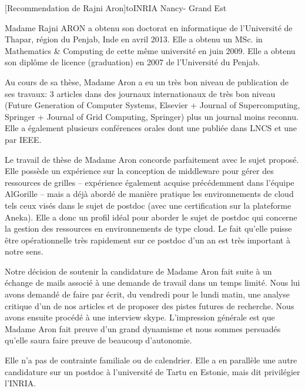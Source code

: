 \documentclass[a4paper,10pt]{article}
\begin{document}

\begin{letter}[Recommendation de Rajni Aron]{to}{INRIA Nancy- Grand Est}


Madame  Rajni ARON  a obtenu  son doctorat  en informatique  de l'Université  de
Thapar,  région  du Penjab,  Inde  en  avril 2013.  Elle  a  obtenu un  MSc.  in
Mathematics \&  Computing de cette même  université en juin 2009.  Elle a obtenu
son diplôme de licence (graduation) en 2007 de l'Université du Penjab.

Au cours de sa thèse, Madame Aron a  eu un très bon niveau de publication de ses
travaux: 3 articles dans des journaux  internationaux de très bon niveau (Future
Generation of Computer Systems, Elsevier + Journal of Supercomputing, Springer +
Journal  of Grid  Computing, Springer)  plus un  journal moins  reconnu. Elle  a
également plusieurs  conférences orales dont  une publiée  dans LNCS et  une par
IEEE.

Le travail de thèse de Madame  Aron concorde parfaitement avec le sujet proposé.
Elle  possède un  expérience  sur la  conception de  middleware  pour gérer  des
ressources de grilles -- expérience également acquise précédemment dans l'équipe
AlGorille -- mais a déjà abordé  de manière pratique les environnements de cloud
tels  ceux  visés dans  le  sujet  de postdoc  (avec  une  certification sur  la
plateforme Aneka).  Elle a donc un profil idéal pour aborder le sujet de postdoc
qui concerne la gestion des ressources  en environnements de type cloud. Le fait
qu'elle puisse  être opérationnelle très rapidement  sur ce postdoc d'un  an est
très important à notre sens.


Notre décision de soutenir la candidature de Madame Aron fait suite à un échange
de mails associé à une demande de  travail dans un temps limité.  Nous lui avons
demandé  de faire  par  écrit, du  vendredi  pour le  lundi  matin, une  analyse
critique  d'un   de  nos  articles  et   de  proposer  des  pistes   futures  de
recherche.  Nous  avons ensuite  procédé  à  une interview  skype.  L'impression
générale est  que Madame Aron  fait preuve d'un  grand dynamisme et  nous sommes
persuadés qu'elle saura faire preuve de beaucoup d'autonomie.

Elle n'a pas de  contrainte familiale ou de calendrier. Elle  a en parallèle une
autre candidature  sur un postdoc à  l'université de Tartu en  Estonie, mais dit
privilégier l'INRIA. 





\end{letter}
\begin{flushright}
\end{flushright}
%
%
\end{document}
